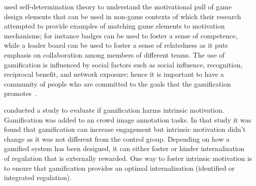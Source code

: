 \cite{sailer2013:psychological} used self-determination theory to understand the motivational pull of game design elements that can be used in non-game contexts of which their research attempted to provide examples of matching game elements to motivation mechanisms; for instance badges can be used to foster a sense of competence, while a leader board can be used to foster a sense of relatedness as it puts emphasis on collaboration among members of different teams. The use of gamification is influenced by social factors such as social influence, recognition, reciprocal benefit, and network exposure; hence it is important to have a community of people who are committed to the goals that the gamification promotes~\citep{hamari2013social}.

\cite{mekler2013points} conducted a study to evaluate if gamification harms intrinsic motivation. Gamification was added to an crowd image annotation tasks. In that study it was found that gamification can increase engagement but intrinsic motivation didn't change as it was not different from the control group. Depending on how a gamified system has been designed, it can either foster or hinder internalization of regulation that is externally rewarded. One way to foster intrinsic motivation is to ensure that gamification provides an optimal internalization (identified or integrated regulation).

